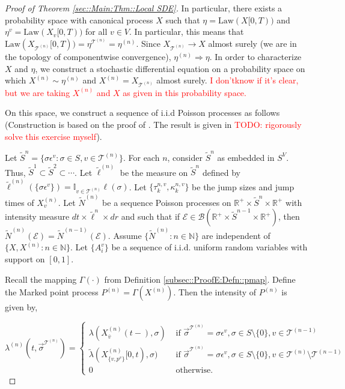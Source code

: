 \documentclass[12pt]{article}
\newcommand{\mb}{\mathbb}
\newcommand{\mc}{\mathcal}
\newcommand{\ms}{\mathscr}
\newcommand{\ra}{\rightarrow}
\newcommand{\ov}{\overline}
\newcommand{\te}{\text}
\newcommand{\ep}{\epsilon}
\newcommand{\tr}{\textcolor{red}}
\newcommand{\ind}{\hspace{24pt}}
\renewcommand{\v}{v}							%
\renewcommand{\S}{S}							%
\newcommand{\s}{\sigma}							%
\newcommand{\sv}{\vec{\s}}						%
\newcommand{\ev}{\ep}							%
\newcommand{\T}{T}								%
\renewcommand{\t}{t}							%
\newcommand{\X}{X}								%
\newcommand{\vind}[1]{^{#1}}					%
\newcommand{\carp}[1]{^{#1}}					%
\newcommand{\vsi}[1]{^{#1}}						%
\newcommand{\cind}[1]{_{#1}}					%
\newcommand{\cl}{\ov}							%
\newcommand{\tp}[1]{(#1)}						%
\newcommand{\tip}[1]{#1}						%
\newcommand{\slnvind}[2]{^{#1,#2}}				%
\newcommand{\tree}{\mc{T}}						%
\newcommand{\sln}[1]{^{(#1)}}					%
\newcommand{\poiss}{N}							%
\newcommand{\Sm}{\ell}							%
\newcommand{\rate}{\lambda}						%
\renewcommand{\r}{r}							%
\newcommand{\alt}[1]{\widetilde{#1}}			%
\newcommand{\indx}[1]{_{#1}}					%
\newcommand{\mmm}{\eta}							%
\newcommand{\law}{\te{Law}}						%
\newcommand{\rt}{\tau}							%
\renewcommand{\it}{k}							%
\newcommand{\evnt}{\mc{E}}						%
\newcommand{\rv}{A}								%
\newcommand{\pmap}{\Gamma}						%
\renewcommand{\mark}{\kappa}					%
\newcommand{\rp}{P}								%
\newcommand{\crate}{\alt{\lambda}}				%
\newcommand{\p}{p}								%
\begin{document}
\begin{proof}[Proof of Theorem \ref{sec::Main:Thm::Local SDE}]
\ind In particular, there exists a probability space with canonical process \(\X\) such that \(\mmm = \law(\X\tip{[0,\T)})\) and \(\mmm\vind{\v} = \law(\X\cind{\v}\tip{[0,\T)})\) for all \(\v \in V\). In particular, this means that \(\law(\X\cind{\tree\sln{n}}\tip{[0,\T)}) = \mmm\vind{\tree\sln{n}} = \mmm\sln{n}\). Since \(\X\cind{\tree\sln{n}} \ra \X\) almost surely (we are in the topology of componentwise convergence), \(\mmm\sln{n} \Rightarrow \mmm\). In order to characterize \(\X\) and \(\mmm\), we construct a stochastic differential equation on a probability space on which \(\X\sln{n} \sim \mmm\sln{n}\) and \(\X\sln{n} = \X\cind{\tree\sln{n}}\) almost surely. \tr{I don'\t know if it's clear, but we are taking \(\X\sln{n}\) and \(\X\) as given in this probability space.}

\ind On this space, we construct a sequence of i.i.d Poisson processes as follows (Construction is based on the proof of \cite[Theorem 14.7.1(b)]{DalVer08}. The result is given in \cite[Exercise 14.7.1]{DalVer08} \tr{TODO: rigorously solve this exercise myself}).

\ind Let \(\alt{\S}^n = \{\s\ev\vind{\v}: \s\in\S,\v \in \tree\sln{n}\}\). For each \(n\), consider \(\alt{\S}^n\) as embedded in \(\S\carp{V}\). Thus, \(\alt{\S}^1 \subset \alt{\S}^2 \subset \cdots\). Let \(\alt{\Sm}\sln{n}\) be the measure on \(\alt{\S}^n\) defined by \(\alt{\Sm}\sln{n}(\{\s\ev\vind{\v}\}) = \mb{I}_{\v \in \tree\sln{n}}\Sm(\s)\). Let \(\{\rt\slnvind{n}{\v}\indx{\it},\mark\indx{\it}\slnvind{n}{\v}\}\) be the jump sizes and jump times of \(\X\sln{n}\cind{\v}\). Let \(\alt{\poiss}\sln{n}\) be a sequence Poisson processes on \(\mb{R}^+\times\alt{\S}^n\times \mb{R}^+\) with intensity measure \(d\t\times\alt{\Sm}^n\times d\r\) and such that if \(\evnt \in \ms{B}(\mb{R}^+\times\alt{\S}^{n-1}\times \mb{R}^+)\), then \(\alt{\poiss}\sln{n}(\evnt) = \alt{\poiss}\sln{n-1}(\evnt)\). Assume \(\{\alt{\poiss}\sln{n}:n\in\mb{N}\}\) are independent of \(\{\X,\X\sln{n}:n\in\mb{N}\}\). Let \(\{\rv\vind{\v}\indx{i}\}\) be a sequence of i.i.d. uniform random variables with support on \([0,1]\).

\ind Recall the mapping \(\pmap(\cdot)\) from Definition \ref{subsec::ProofE:Defn::pmap}. Define the Marked point process \(\rp\sln{n} = \pmap(\X\sln{n})\). Then the intensity of \(\rp\sln{n}\) is given by,

\[\rate\sln{n}(\t,\sv\vsi{\tree\sln{n}}) = \begin{cases}
\rate(\X\sln{n}\cind{\cl{\v}}\tp{\t-},\s) &\te{ if } \sv\vsi{\tree\sln{n}} = \s\ev\vind{\v},\s \in \S\setminus\{0\},\v\in\tree\sln{n-1}\\
\crate(\X\sln{n}\cind{\{\v,\p\vind{\v}\}}\tip{[0,\t)},\s) &\te{ if } \sv\vsi{\tree\sln{n}} = \s\ev\vind{\v},\s\in\S\setminus\{0\},\v\in\tree\sln{n}\setminus\tree\sln{n-1}\\
0 &\te{ otherwise.}
\end{cases}\]


\end{proof}
\end{document}
